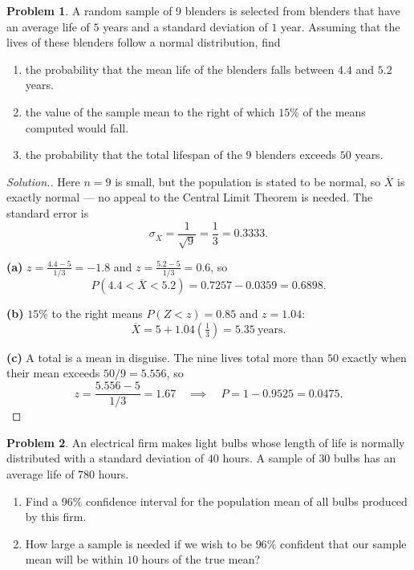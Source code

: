 \documentclass[11pt,a4paper]{article}
\theoremstyle{definition}
\newtheorem{problemx}{Problem}[section]
\newenvironment{problem}{\begin{problemx}}{\end{problemx}}
\newenvironment{solution}
  {\renewcommand{\qedsymbol}{}\begin{proof}[\textit{Solution}.]}
  {\end{proof}}
\begin{document}
\begin{problem}
A random sample of $9$ blenders is selected from blenders that have an average life of $5$
years and a standard deviation of $1$ year. Assuming that the lives of these blenders follow
a normal distribution, find
\begin{enumerate}
\item[(a).] the probability that the mean life of the blenders falls between $4.4$ and
$5.2$ years.
\item[(b).] the value of the sample mean to the right of which $15\%$ of the means computed
would fall.
\item[(c).] the probability that the total lifespan of the $9$ blenders exceeds $50$ years.
\end{enumerate}
\end{problem}

\begin{solution}
Here $n=9$ is small, but the population is stated to be normal, so $\overline{X}$ is exactly
normal --- no appeal to the Central Limit Theorem is needed. The standard error is
\[\sigma_{\overline{X}}=\frac{1}{\sqrt{9}}=\frac{1}{3}=0.3333.\]

\textbf{(a)} $z=\frac{4.4-5}{1/3}=-1.8$ and $z=\frac{5.2-5}{1/3}=0.6$, so
\[P(4.4<\overline{X}<5.2)=0.7257-0.0359=0.6898.\]

\textbf{(b)} $15\%$ to the right means $P(Z<z)=0.85$ and $z=1.04$:
\[\overline{X}=5+1.04\left(\tfrac{1}{3}\right)=5.35\ \text{years}.\]

\textbf{(c)} A total is a mean in disguise. The nine lives total more than $50$ exactly when
their mean exceeds $50/9=5.556$, so
\[z=\frac{5.556-5}{1/3}=1.67\quad\implies\quad P=1-0.9525=0.0475.\]
\end{solution}

\begin{problem}
An electrical firm makes light bulbs whose length of life is normally distributed with a
standard deviation of $40$ hours. A sample of $30$ bulbs has an average life of $780$ hours.
\begin{enumerate}
\item[(a).] Find a $96\%$ confidence interval for the population mean of all bulbs produced
by this firm.
\item[(b).] How large a sample is needed if we wish to be $96\%$ confident that our sample
mean will be within $10$ hours of the true mean?
\end{enumerate}
\end{problem}
\end{document}
